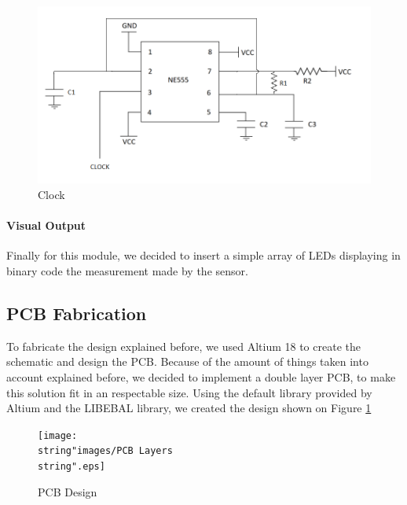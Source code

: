 \begin{figure}[H]
\begin{centering}
\includegraphics[scale=0.5]{images/CLOCK}
\par\end{centering}
\caption{Clock}

\end{figure}

\paragraph{Visual Output}

Finally for this module, we decided to insert a simple array of LEDs
displaying in binary code the measurement made by the sensor.

\subsection{PCB Fabrication}

To fabricate the design explained before, we used Altium 18 to create
the schematic and design the PCB. Because of the amount of things
taken into account explained before, we decided to implement a double
layer PCB, to make this solution fit in an respectable size. Using
the default library provided by Altium and the LIBEBAL library, we
created the design shown on Figure \ref{8_9}

\begin{figure}[H]
\begin{centering}
\texttt{[image: \\string"images/PCB Layers\\string".eps]}
\par\end{centering}
\caption{PCB Design}
\label{8_9}
\end{figure}

